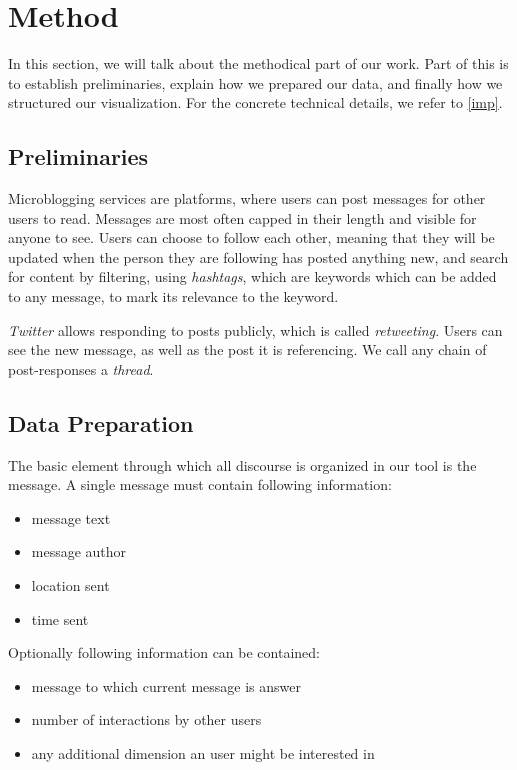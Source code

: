 
\chapter{Method}

In this section, we will talk about the methodical part of our work. Part of this is to establish preliminaries, explain how we prepared our data, and finally how we structured our visualization. For the concrete technical details, we refer to \ref{imp}.
\section{Preliminaries}
Microblogging services are platforms, where users can post messages for other users to read. Messages are most often capped in their length and visible for anyone to see. Users can choose to follow each other, meaning that they will be updated when the person they are following has posted anything new, and search for content by filtering, using \emph{hashtags}, which are keywords which can be added to any message, to mark its relevance to the keyword. 

\emph{Twitter} allows responding to posts publicly, which is called \emph{retweeting}. Users can see the new message, as well as the post it is referencing. We call any chain of post-responses a \emph{thread}.
\section{Data Preparation}


The basic element through which all discourse is organized in our tool is the message. A single message must contain following information:
\begin{itemize}
    \item message text
    \item message author
    \item location sent
    \item time sent
\end{itemize}
Optionally following information can be contained:
\begin{itemize}
    \item message to which current message is answer
    \item number of interactions by other users
    \item any additional dimension an user might be interested in
\end{itemize}

